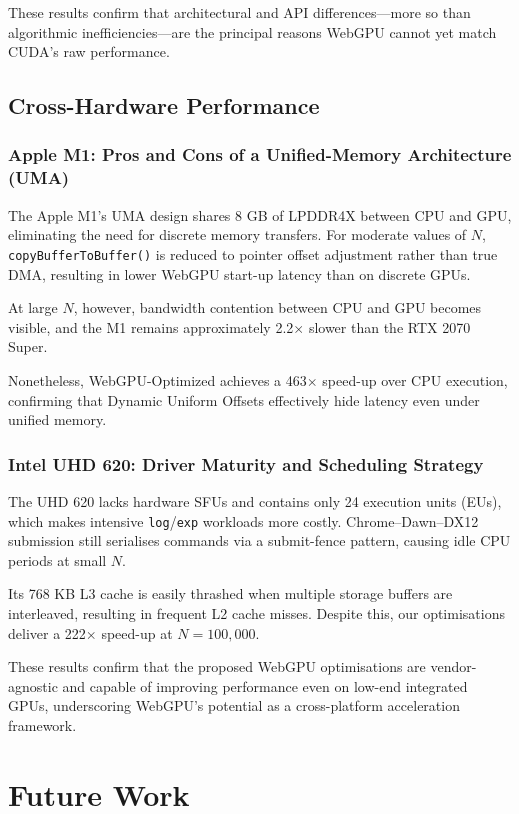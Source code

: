 \documentclass[PhD]{PHlab-thesis}
\begin{document}
These results confirm that architectural and API differences—more so than algorithmic inefficiencies—are the principal reasons WebGPU cannot yet match CUDA's raw performance.

\section{Cross-Hardware Performance}
\subsection{Apple M1: Pros and Cons of a Unified-Memory Architecture (UMA)}
The Apple M1's UMA design shares 8 GB of LPDDR4X between CPU and GPU, eliminating the need for discrete memory transfers. For moderate values of $N$, \texttt{copyBufferToBuffer()} is reduced to pointer offset adjustment rather than true DMA, resulting in lower WebGPU start-up latency than on discrete GPUs.

At large $N$, however, bandwidth contention between CPU and GPU becomes visible, and the M1 remains approximately 2.2$\times$ slower than the RTX 2070 Super.

Nonetheless, WebGPU-Optimized achieves a 463$\times$ speed-up over CPU execution, confirming that Dynamic Uniform Offsets effectively hide latency even under unified memory.

\subsection{Intel UHD 620: Driver Maturity and Scheduling Strategy}
The UHD 620 lacks hardware SFUs and contains only 24 execution units (EUs), which makes intensive \texttt{log}/\texttt{exp} workloads more costly. Chrome–Dawn–DX12 submission still serialises commands via a submit-fence pattern, causing idle CPU periods at small $N$.

Its 768 KB L3 cache is easily thrashed when multiple storage buffers are interleaved, resulting in frequent L2 cache misses. Despite this, our optimisations deliver a 222$\times$ speed-up at $N = 100,000$.

These results confirm that the proposed WebGPU optimisations are vendor-agnostic and capable of improving performance even on low-end integrated GPUs, underscoring WebGPU's potential as a cross-platform acceleration framework.



\chapter{Future Work}
\end{document}
